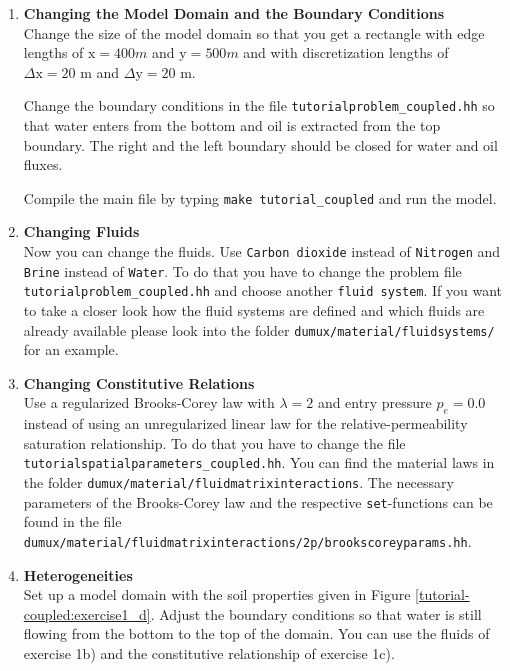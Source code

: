 \begin{enumerate}
\item \textbf{Changing the Model Domain and the Boundary Conditions} \\

  Change the size of the model domain so that you get a rectangle with
  edge lengths of $\text{x} = 400 m$ and $\text{y} = 500 m$ and with
  discretization lengths of $\Delta \text{x} = 20$ m and $\Delta
  \text{y} = 20$ m.
  
  Change the boundary conditions in the file
  \texttt{tutorialproblem\_coupled.hh} so that water enters from the
  bottom and oil is extracted from the top boundary. The right and the
  left boundary should be closed for water and oil fluxes. 

  Compile the main file by typing \texttt{make tutorial\_coupled} and
  run the model.


\item \textbf{Changing Fluids} \\
  Now you can change the fluids. Use \texttt{Carbon dioxide} instead of
  \texttt{Nitrogen} and \texttt{Brine} instead of \texttt{Water}. To do
  that you have to change the problem file
  \texttt{tutorialproblem\_coupled.hh} and choose another \texttt{fluid system}. 
  If you want to take a closer look how the fluid systems are defined 
  and which fluids are already available please look into the folder \verb+dumux/material/fluidsystems/+
  for an example.


\item \textbf{Changing Constitutive Relations} \\
  Use a regularized Brooks-Corey law with $\lambda = 2$ and entry pressure $p_e =
  0.0$ instead of using an unregularized linear law for the
  relative-permeability saturation relationship. To do that you have
  to change the file \texttt{tutorialspatialparameters\_coupled.hh}. 
 You can find the material laws in the folder 
  \verb+dumux/material/fluidmatrixinteractions+. The necessary parameters
of the Brooks-Corey law and the respective \texttt{set}-functions can be found
 in the file \verb+dumux/material/fluidmatrixinteractions/2p/brookscoreyparams.hh+.
 
\item \textbf{Heterogeneities}  \\
  Set up a model domain with the soil properties given in Figure
  \ref{tutorial-coupled:exercise1_d}. Adjust the boundary conditions
  so that water is still flowing from the bottom to the top of the
  domain. You can use the fluids of exercise 1b) and the constitutive
  relationship of exercise 1c).


\end{enumerate}
